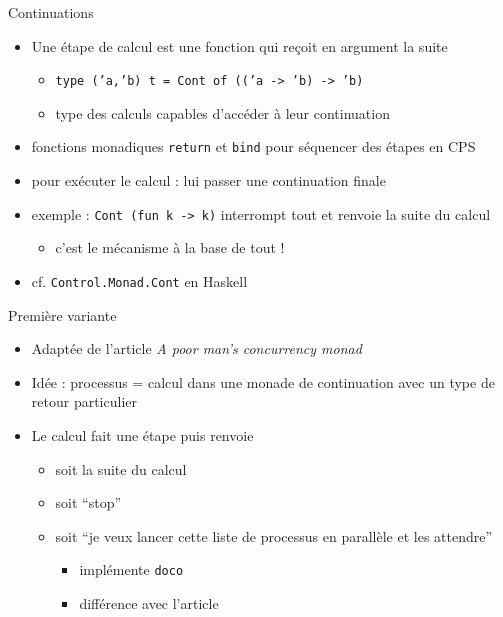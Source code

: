 \documentclass[xetex]{beamer}
\begin{document}
\begin{frame}{Continuations}
  \begin{itemize}
  \item Une étape de calcul est une fonction qui reçoit en argument
    la suite
    \begin{itemize}
    \item \texttt{type ('a,'b) t = Cont of (('a -> 'b) -> 'b)}
    \item type des calculs capables d'accéder à leur continuation
    \end{itemize}
  \item fonctions monadiques \texttt{return} et \texttt{bind} pour
    séquencer des étapes en CPS
  \item pour exécuter le calcul : lui passer une continuation finale
  \item exemple : \texttt{Cont (fun k -> k)} interrompt tout et renvoie
    la suite du calcul
    \begin{itemize}
    \item c'est le mécanisme à la base de tout !
    \end{itemize}
  \item cf. \texttt{Control.Monad.Cont} en Haskell
  \end{itemize}
\end{frame}

\begin{frame}{Première variante}
  \begin{itemize}
  \item Adaptée de l'article \emph{A poor man's concurrency monad}
  \item Idée : processus = calcul dans une monade de continuation
    avec un type de retour particulier
  \item Le calcul fait une étape puis renvoie
    \begin{itemize}
    \item soit la suite du calcul
    \item soit ``stop''
    \item soit ``je veux lancer cette liste de processus en parallèle
      et les attendre''
      \begin{itemize}
      \item implémente \texttt{doco}
      \item différence avec l'article
      \end{itemize}
    \end{itemize}
  \end{itemize}
\end{frame}
\end{document}
